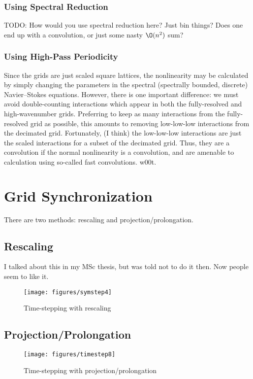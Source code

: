 \documentclass[10pt,showpacs,showkeys,%
amsfonts,amsmath,onecolumn,
floatfix,aps,superscriptaddress]{revtex4}
\begin{document}
\subsubsection{Using Spectral Reduction}

TODO: How would you use spectral reduction here?  Just bin things?
Does one end up with a convolution, or just some nasty $\O(n^2)$ sum?

\subsubsection{Using High-Pass Periodicity}

Since the grids are just scaled square lattices, the nonlinearity may
be calculated by simply changing the parameters in the spectral
(spectrally bounded, discrete) Navier--Stokes equations.  However,
there is one important difference: we must avoid double-counting
interactions which appear in both the fully-resolved and
high-wavenumber grids.  Preferring to keep as many interactions from
the fully-resolved grid as possible, this amounts to removing
low-low-low interactions from the decimated grid.  Fortunately, (I
think) the low-low-low interactions are just the scaled interactions
for a subset of the decimated grid.  Thus, they are a convolution if
the normal nonlinearity is a convolution, and are amenable to
calculation using so-called fast convolutions.  w00t.

\section{Grid Synchronization}

There are two methods: rescaling and  projection/prolongation.

\subsection{Rescaling}
I talked about this in my MSc thesis, but was told not to do it then.  Now 
people seem to like it.
\begin{figure}[htbp]
  \begin{center}
    \texttt{[image: figures/symstep4]}
    \caption{Time-stepping with rescaling}
    \label{symstep4}
  \end{center}
\end{figure}


\subsection{Projection/Prolongation}
\begin{figure}[htbp]
  \begin{center}
    \texttt{[image: figures/timestep8]}
    \caption{Time-stepping with projection/prolongation}
    \label{timestep8}
  \end{center}
\end{figure}
\end{document}
